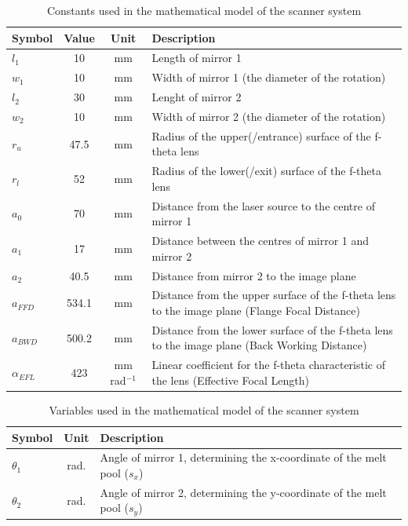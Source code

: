 \begin{table}[H]
    \centering
    \begin{tabular}{l|c|c|p{100mm}}
        Symbol  & Value & Unit  & Description \\ \hline
        $l_1$   & 10    & mm    & Length of mirror 1 \\
        $w_1$   & 10    & mm    & Width of mirror 1 (the diameter of the rotation) \\
        $l_2$   & 30    & mm    & Lenght of mirror 2 \\
        $w_2$   & 10    & mm    & Width of mirror 2 (the diameter of the rotation) \\
        $r_u$   & 47.5  & mm    & Radius of the upper(/entrance) surface of the f-theta lens \\
        $r_l$   & 52    & mm    & Radius of the lower(/exit) surface of the f-theta lens \\
        $a_0$   & 70    & mm    & Distance from the laser source to the centre of mirror 1 \\
        $a_1$   & 17    & mm    & Distance between the centres of mirror 1 and mirror 2 \\
        $a_2$   & 40.5  & mm    & Distance from mirror 2 to the image plane \\
        $a_{FFD}$ & 534.1 & mm  & Distance from the upper surface of the f-theta lens to the image plane (Flange Focal Distance)\\
        $a_{BWD}$& 500.2 & mm    & Distance from the lower surface of the f-theta lens to the image plane (Back Working Distance)\\
        $\alpha_{EFL}$ & 423 & mm rad$^{-1}$ & Linear coefficient for the f-theta characteristic of the lens (Effective Focal Length)\\
    \end{tabular}
    \caption{Constants used in the mathematical model of the scanner system}
    \label{tab:model-constants}
\end{table}

\begin{table}
    \centering
    \begin{tabular}{l|c|l}
        Symbol      & Unit  & Description \\ \hline
        $\theta_1$  & rad.  & Angle of mirror 1, determining the x-coordinate of the melt pool ($s_x$) \\
        $\theta_2$  & rad.  & Angle of mirror 2, determining the y-coordinate of the melt pool ($s_y$)
    \end{tabular}
    \caption{Variables used in the mathematical model of the scanner system}
    \label{tab:model-vars}
\end{table}


